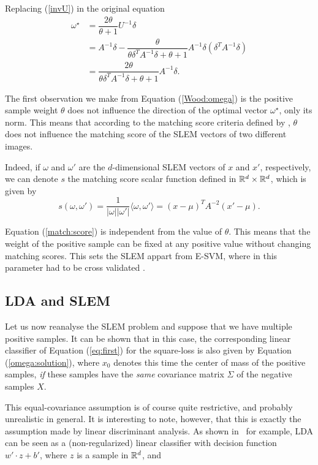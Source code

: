 Replacing (\ref{invU}) in the original equation
\begin{align}
\omega^\star &= \dfrac{2\theta}{\theta+1}U^{-1}\delta \\
&= A^{-1}\delta - \dfrac{\theta}{\theta\delta^TA^{-1}\delta+ \theta+1} A^{-1}\delta (\delta^TA^{-1}\delta)\\
&= \dfrac{2\theta}{\theta\delta^TA^{-1}\delta+ \theta+1} A^{-1}\delta.\label{Wood:omega}
\end{align}

The first observation we make from Equation (\ref{Wood:omega}) is the positive sample weight $\theta$ does not influence the direction of the optimal vector $\omega^\star$, only its norm. This means that according to the matching score criteria defined by \cite{ZePe15}, $\theta$ does not influence the matching score of the SLEM vectors of two different images.

Indeed, if $\omega$ and $\omega'$ are the $d$-dimensional SLEM vectors of $x$ and $x'$, respectively, we can denote $s$ the matching score scalar function defined in $\mathbb R^d\times \mathbb R^d$, which is given by
\begin{equation}
s(\omega, \omega') = \dfrac{1}{|\omega||\omega'|}\langle\omega,\omega'\rangle = (x-\mu)^TA^{-2}(x'-\mu).\label{match:score}
\end{equation}

Equation (\ref{match:score}) is independent from the value of $\theta$. This means that the weight of the positive sample can be fixed at any positive value without changing matching scores. This sets the SLEM appart from E-SVM, where in this parameter had to be cross validated \cite{Efros11, ZePe15}.
\subsection{LDA and SLEM}

Let us now reanalyse the SLEM problem and suppose that we have multiple positive samples. It can be shown that in this case, the corresponding linear classifier of Equation (\ref{eq:first}) for the square-loss is also given by
Equation (\ref{omega:solution}), where $x_0$ denotes this time the center of mass
of the positive samples, {\em if} these samples have the {\em same} covariance matrix $\Sigma$ of the negative samples $X$.
 
This equal-covariance assumption is of course quite restrictive, and
probably unrealistic in general. It is interesting to note, however,
that this is exactly the assumption made by linear discriminant
analysis. As shown in~\cite{Hastie2009} for example, LDA can be seen as a
(non-regularized) linear classifier
with decision function $w'\cdot z+ b'$, where $z$ is a sample in
$\mathbb R^d$, and

